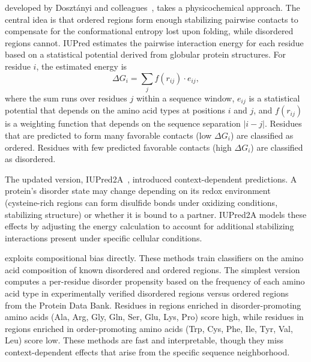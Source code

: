  developed by Doszt\'anyi and
colleagues~\cite{dosztanyi2005,meszaros2018}, takes a physicochemical approach.  The
central idea is that ordered regions form enough stabilizing pairwise contacts to compensate
for the conformational entropy lost upon folding, while disordered regions cannot.  IUPred
estimates the pairwise interaction energy for each residue based on a statistical potential
derived from globular protein structures.  For residue $i$, the estimated energy is
%
\begin{equation}
  \Delta G_i = \sum_{j} f(r_{ij}) \cdot e_{ij},
  \label{eq:iupred-energy}
\end{equation}
%
\noindent where the sum runs over residues $j$ within a sequence window, $e_{ij}$ is a
statistical potential that depends on the amino acid types at positions $i$ and $j$, and
$f(r_{ij})$ is a weighting function that depends on the sequence separation
$|i-j|$.  Residues that are predicted to form many favorable contacts
(low $\Delta G_i$) are classified as ordered.  Residues with few predicted favorable
contacts (high $\Delta G_i$) are classified as disordered.

The updated version, IUPred2A~\cite{meszaros2018}, introduced context-dependent
predictions.  A protein's disorder state may change depending on its redox environment
(cysteine-rich regions can form disulfide bonds under oxidizing conditions, stabilizing
structure) or whether it is bound to a partner.  IUPred2A models these effects by adjusting
the energy calculation to account for additional stabilizing interactions present under
specific cellular conditions.

 exploits compositional bias directly.  These
methods train classifiers on the amino acid composition of known disordered and ordered
regions.  The simplest version computes a per-residue disorder propensity based on the
frequency of each amino acid type in experimentally verified disordered regions versus
ordered regions from the Protein Data Bank.  Residues in regions enriched in
disorder-promoting amino acids (Ala, Arg, Gly, Gln, Ser, Glu, Lys, Pro) score high, while
residues in regions enriched in order-promoting amino acids (Trp, Cys, Phe, Ile, Tyr, Val,
Leu) score low.  These methods are fast and interpretable, though they miss
context-dependent effects that arise from the specific sequence neighborhood.

